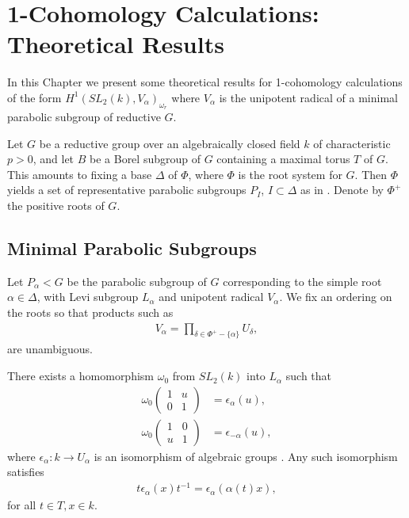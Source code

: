 
\chapter{1-Cohomology Calculations: Theoretical Results}
\label{Chapter5}

In this Chapter we present some theoretical results for 1-cohomology calculations of the form $H^1(SL_2(k), V_\alpha)_{\omega_r}$ where $V_\alpha$ is the unipotent radical of a minimal parabolic subgroup of reductive $G$.

Let $G$ be a reductive group over an algebraically closed field $k$ of characteristic $p>0$, and let $B$ be a Borel subgroup of $G$ containing a maximal torus $T$ of $G$. This amounts to fixing a base $\Delta$ of $\Phi$, where $\Phi$ is the root system for $G$. Then $\Phi$ yields a set of representative parabolic subgroups $P_I$, $I \subset \Delta$ as in \cite[\S 30]{humphreys1975linear}. Denote by $\Phi^+$ the positive roots of $G$.

\section{Minimal Parabolic Subgroups}

Let $P_\alpha<G$ be the parabolic subgroup of $G$ corresponding to the simple root $\alpha\in\Delta$, with Levi subgroup $L_\alpha$ and unipotent radical $V_\alpha$.
We fix an ordering on the roots so that products such as
\begin{align*}
V_\alpha = \prod_{\delta\in\Phi^+ -\{\alpha\}} U_\delta,
\end{align*}
are unambiguous.

There exists a homomorphism $\omega_0$ from $ SL_2(k)$ into $L_\alpha$ such that
\begin{align*}
\omega_0 \left(\begin{matrix} 1 &  u \\ 0 & 1 \end{matrix} \right) &= \epsilon_\alpha(u), \\
\omega_0 \left(\begin{matrix} 1 & 0 \\ u & 1 \end{matrix} \right) &= \epsilon_{-\alpha}(u),
\end{align*}
where $\epsilon_\alpha : k \rightarrow U_\alpha$ is an isomorphism of algebraic groups \cite[Theorem 26.3(c)]{humphreys1975linear}. Any such isomorphism satisfies
\begin{align*}
	t \epsilon_\alpha(x)t^{-1} = \epsilon_\alpha(\alpha(t)x),
\end{align*}
for all $t\in T, x\in k$. 

